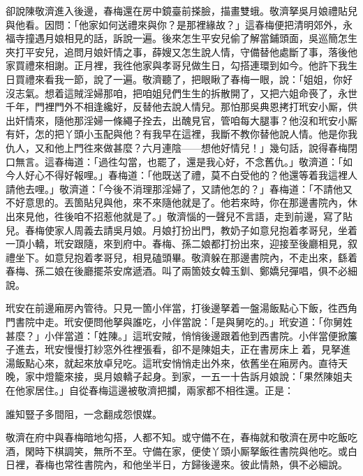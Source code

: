 卻說陳敬濟進入後邊，春梅還在房中鏡臺前搽臉，描畫雙蛾。敬濟拏吳月娘禮貼兒與他看。因問：「他家如何送禮來與你？是那裡緣故？」這春梅便把清明郊外，永福寺撞遇月娘相見的話，訴說一遍。後來怎生平安兒偷了解當鋪頭面，吳巡簡怎生夾打平安兒，追問月娘奸情之事，薛嫂又怎生說人情，守備替他處斷了事，落後他家買禮來相謝。正月裡，我徃他家與孝哥兒做生日，勾搭連環到如今。他許下我生日買禮來看我一節，說了一遍。敬濟聽了，把眼瞅了春梅一眼，說：「姐姐，你好沒志氣。想着這賊淫婦那咱，把咱姐兒們生生的拆散開了，又把六姐命䘮了，永世千年，門裡門外不相逢纔好，反替他去說人情兒。那怕那吳典恩拷打玳安小厮，供出奸情來，隨他那淫婦一條繩子拴去，出醜見官，管咱每大腿事？他沒和玳安小厮有奸，怎的把丫頭小玉配與他？{}有我早在這裡，我斷不教你替他說人情。他是你我仇人，又和他上門徃來做甚麼？六月連陰——想他好情兒！」{}幾句話，說得春梅閉口無言。這春梅道：「過徃勾當，也罷了，還是我心好，不念舊仇。」敬濟道：「如今人好心不得好報哩。」春梅道：「他既送了禮，莫不白受他的？他還等着我這裡人請他去哩。」敬濟道：「今後不消理那淫婦了，又請他怎的？」春梅道：「不請他又不好意思的。丟箇貼兒與他，來不來隨他就是了。他若來時，你在那邊書院內，休出來見他，徃後咱不招惹他就是了。」敬濟惱的一聲兒不言語，走到前邊，寫了貼兒。春梅使家人周義去請吳月娘。月娘打扮出門，教奶子如意兒抱着孝哥兒，坐着一頂小轎，玳安跟隨，來到府中。春梅、孫二娘都打扮出來，迎接至後廳相見，叙禮坐下。如意兒抱着孝哥兒，相見磕頭畢。敬濟躲在那邊書院內，不走出來，繇着春梅、孫二娘在後廳擺茶安席遞酒。叫了兩箇妓女韓玉釧、鄭嬌兒彈唱，俱不必細說。

玳安在前邊廂房內管待。只見一箇小伴當，打後邊拏着一盤湯飯點心下飯，徃西角門書院中走。玳安便問他拏與誰吃，小伴當說：「是與舅吃的。」玳安道：「你舅姓甚麼？」小伴當道：「姓陳。」這玳安賊，悄悄後邊跟着他到西書院。小伴當便掀簾子進去，玳安慢慢打紗窓外徃裡張看，卻不是陳姐夫，正在書房床上𢱉着，見拏進湯飯點心來，就起來放卓兒吃。這玳安悄悄走出外來，依舊坐在廂房內。直待天晚，家中燈籠來接，吳月娘轎子起身。到家，一五一十告訴月娘說：「果然陳姐夫在他家居住。」自從春梅這邊被敬濟把攔，兩家都不相徃還。正是：

\begin{myquote}
誰知豎子多間阻，一念翻成怨恨媒。
\end{myquote}

敬濟在府中與春梅暗地勾搭，人都不知。或守備不在，春梅就和敬濟在房中吃飯吃酒，閑時下棋調笑，無所不至。守備在家，便使丫頭小厮拏飯徃書院與他吃。或白日裡，春梅也常徃書院內，和他坐半日，方歸後邊來。彼此情熱，俱不必細說。

